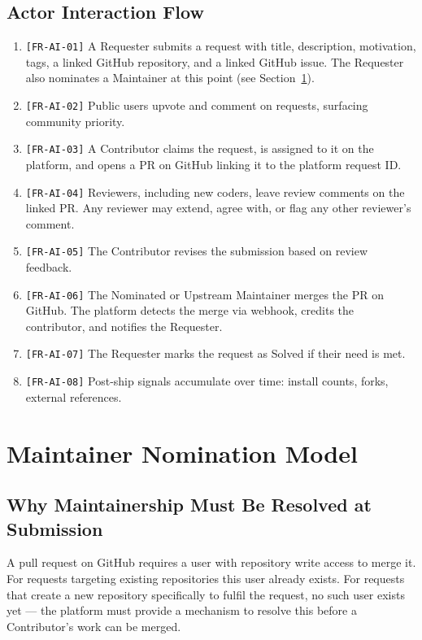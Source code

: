 \documentclass[12pt,a4paper]{article}
\begin{document}
\subsection{Actor Interaction Flow}
\begin{enumerate}
  \item \texttt{[FR-AI-01]} A Requester submits a request with title, description, motivation, tags, a linked GitHub repository, and a linked GitHub issue. The Requester also nominates a Maintainer at this point (see Section~\ref{sec:maintainer}).
  \item \texttt{[FR-AI-02]} Public users upvote and comment on requests, surfacing community priority.
  \item \texttt{[FR-AI-03]} A Contributor claims the request, is assigned to it on the platform, and opens a PR on GitHub linking it to the platform request ID.
  \item \texttt{[FR-AI-04]} Reviewers, including new coders, leave review comments on the linked PR. Any reviewer may extend, agree with, or flag any other reviewer's comment.
  \item \texttt{[FR-AI-05]} The Contributor revises the submission based on review feedback.
  \item \texttt{[FR-AI-06]} The Nominated or Upstream Maintainer merges the PR on GitHub. The platform detects the merge via webhook, credits the contributor, and notifies the Requester.
  \item \texttt{[FR-AI-07]} The Requester marks the request as Solved if their need is met.
  \item \texttt{[FR-AI-08]} Post-ship signals accumulate over time: install counts, forks, external references.
\end{enumerate}

\section{Maintainer Nomination Model}
\label{sec:maintainer}

\subsection{Why Maintainership Must Be Resolved at Submission}
A pull request on GitHub requires a user with repository write access to merge it. For requests targeting existing repositories this user already exists. For requests that create a new repository specifically to fulfil the request, no such user exists yet --- the platform must provide a mechanism to resolve this before a Contributor's work can be merged.
\end{document}
